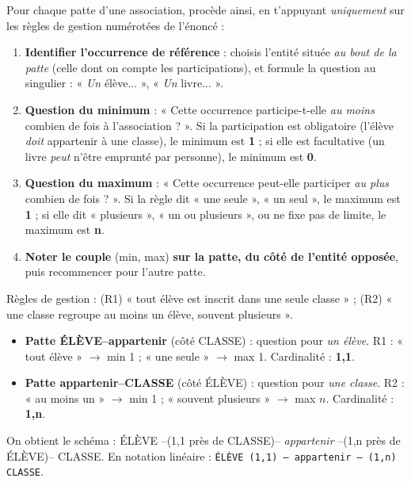 \documentclass[11pt]{article}
\begin{document}
\begin{methode}
Pour chaque patte d'une association, procède ainsi, en t'appuyant \emph{uniquement} sur les règles de gestion numérotées de l'énoncé :
\begin{enumerate}
\item \textbf{Identifier l'occurrence de référence} : choisis l'entité située \emph{au bout de la patte} (celle dont on compte les participations), et formule la question au singulier : « \emph{Un} élève... », « \emph{Un} livre... ».
\item \textbf{Question du minimum} : « Cette occurrence participe-t-elle \emph{au moins} combien de fois à l'association ? ». Si la participation est obligatoire (l'élève \emph{doit} appartenir à une classe), le minimum est \textbf{1} ; si elle est facultative (un livre \emph{peut} n'être emprunté par personne), le minimum est \textbf{0}.
\item \textbf{Question du maximum} : « Cette occurrence peut-elle participer \emph{au plus} combien de fois ? ». Si la règle dit « une seule », « un seul », le maximum est \textbf{1} ; si elle dit « plusieurs », « un ou plusieurs », ou ne fixe pas de limite, le maximum est \textbf{n}.
\item \textbf{Noter le couple} (min, max) \textbf{sur la patte, du côté de l'entité opposée}, puis recommencer pour l'autre patte.
\end{enumerate}
\end{methode}

\begin{exemplebox}
Règles de gestion : (R1) « tout élève est inscrit dans une seule classe » ; (R2) « une classe regroupe au moins un élève, souvent plusieurs ».
\begin{itemize}
\item \textbf{Patte ÉLÈVE--appartenir} (côté CLASSE) : question pour \emph{un élève}. R1 : « tout élève » $\rightarrow$ min 1 ; « une seule » $\rightarrow$ max 1. Cardinalité : \textbf{1,1}.
\item \textbf{Patte appartenir--CLASSE} (côté ÉLÈVE) : question pour \emph{une classe}. R2 : « au moins un » $\rightarrow$ min 1 ; « souvent plusieurs » $\rightarrow$ max $n$. Cardinalité : \textbf{1,n}.
\end{itemize}
On obtient le schéma : ÉLÈVE --(1,1 près de CLASSE)-- \emph{appartenir} --(1,n près de ÉLÈVE)-- CLASSE.
En notation linéaire : \texttt{ÉLÈVE (1,1) — appartenir — (1,n) CLASSE}.
\end{exemplebox}
\end{document}
